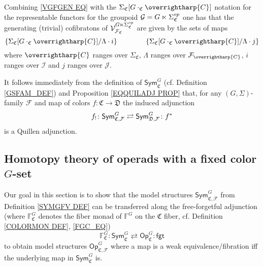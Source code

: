 \documentclass[a4paper,10pt
,draft
]{article}%
\renewcommand{\F}{\mathcal F}
\renewcommand{\1}{\eta}%
\newcommand{\vect}[1]{\text{\overrightharp{\ensuremath{#1}}}}
\begin{document}
\begin{remark}\label{VGSIGF REM}
Combining \eqref{VGFGEN EQ} with the 
$\Sigma_{\mathfrak{C}}[G \cdot_{\mathfrak{C}} \vect{C}]$ notation
for the representable functors for the groupoid
$\mathcal{G} = G \ltimes \Sigma^{op}_{\mathfrak{C}}$
one has that the generating (trivial) cofibratons of
$\V^{G \ltimes \Sigma_{\mathfrak{C}}^{op}}_{\F_{\mathfrak{C}}}$
are given by the sets of maps
\begin{equation}\label{VGSIGF EQ}
	\left\{
	\Sigma_{\mathfrak{C}}[G \cdot_{\mathfrak{C}} \vect{C}]/\Lambda \cdot i
	\right\}
\qquad \qquad
	\left\{
	\Sigma_{\mathfrak{C}}[G \cdot_{\mathfrak{C}} \vect{C}]/\Lambda \cdot j
	\right\}
\end{equation}
where $\vect{C}$ ranges over $\Sigma_{\mathfrak{C}}$,
$\Lambda$ ranges over $\F_{\vect{C}}$,
$i$ ranges over $\mathcal{I}$ and
$j$ ranges over $\mathcal{J}$.
\end{remark}





\begin{remark}
It follows immediately from the definition of $\mathsf{Sym}^G_{\mathfrak{C}}$ (cf. Definition \ref{GSFAM_DEF}) and 
Proposition \ref{EQQUILADJ PROP} that, for any 
$(G,\Sigma)$-family $\F$
and map of colors $f \colon \mathfrak{C} \to \mathfrak{D}$
the induced adjunction
\[
	f_! \colon \mathsf{Sym}^G_{\mathfrak{C},\F}
	\rightleftarrows
	\mathsf{Sym}^G_{\mathfrak{D},\F} \colon f^{\**}
\]
is a Quillen adjunction.
\end{remark}




 
\subsection{Homotopy theory of operads with a fixed color $G$-set}
\label{OPC_MS_SEC}

Our goal in this section is to show that the model structures 
$\mathsf{Sym}^G_{\mathfrak{C},\F}$
from Definition \ref{SYMGFV DEF} can be transferred 
along the free-forgetful adjunction
(where $\mathbb{F}^G_{\mathfrak{C}}$
denotes the fiber monad of $\mathbb{F}^G$ on the $\mathfrak{C}$ fiber, cf. Definition \ref{COLORMON DEF}, \eqref{FGC_EQ})
\begin{equation}\label{OPAUTADJ EQ}
\mathbb{F}^G_{\mathfrak{C}} \colon
\mathsf{Sym}^G_{\mathfrak{C}}
\rightleftarrows
\mathsf{Op}^G_{\mathfrak{C}}
\colon \mathsf{fgt}
\end{equation}
to obtain model structures
$\mathsf{Op}^G_{\mathfrak{C},\F}$
where a map is a weak equivalence/fibration iff the underlying map in 
$\mathsf{Sym}^G_{\mathfrak{C}}$ is.
\end{document}
